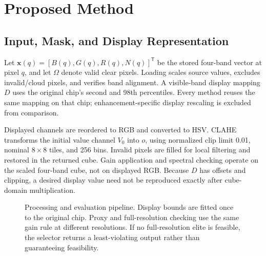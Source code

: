 \documentclass[conference]{IEEEtran}
\begin{document}
\section{Proposed Method}
\label{sec:method}
\subsection{Input, Mask, and Display Representation}
Let $\mathbf{x}(q)=[B(q),G(q),R(q),N(q)]^\mathsf{T}$ be the stored four-band vector at pixel $q$, and let $\Omega$ denote valid clear pixels. Loading scales source values, excludes invalid/cloud pixels, and verifies band alignment. A visible-band display mapping $D$ uses the original chip's second and 98th percentiles. Every method reuses the same mapping on that chip; enhancement-specific display rescaling is excluded from comparison.

Displayed channels are reordered to RGB and converted to HSV. CLAHE transforms the initial value channel $V_0$ into $o$, using normalized clip limit 0.01, nominal $8\times8$ tiles, and 256 bins. Invalid pixels are filled for local filtering and restored in the returned cube. Gain application and spectral checking operate on the scaled four-band cube, not on displayed RGB. Because $D$ has offsets and clipping, a desired display value need not be reproduced exactly after cube-domain multiplication.

\begin{figure}[t]
\centering

\caption{Processing and evaluation pipeline. Display bounds are fitted once to the original chip. Proxy and full-resolution checking use the same gain rule at different resolutions. If no full-resolution elite is feasible, the selector returns a least-violating output rather than guaranteeing feasibility.}
\label{fig:pipeline}
\end{figure}
\end{document}
